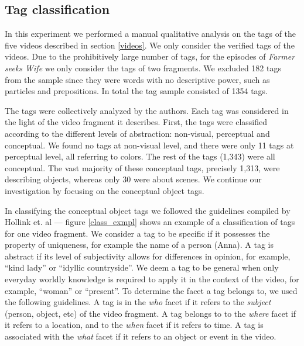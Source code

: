 \subsection{Tag classification}

In this experiment we performed a manual qualitative analysis on the tags of
the five videos described in section \ref{videos}. We only consider the
verified tags of the videos. Due to the prohibitively large number of tags,
for the episodes of \emph{Farmer seeks Wife} we only consider the tags of two
fragments. We excluded 182 tags from the sample since they were words with no
descriptive power, such as particles and prepositions. In total the tag sample
consisted of 1354 tags.

The tags were collectively analyzed by the authors. Each tag was considered in
the light of the video fragment it describes. First, the tags were classified
according to the different levels of abstraction: non-visual, perceptual and
conceptual. We found no tags at non-visual level, and there were only 11 tags
at perceptual level, all referring to colors. The rest of the tags (1,343)
were all conceptual. The vast majority of these conceptual tags, precisely
1,313, were describing objects, whereas only 30 were about scenes. We continue
our investigation by focusing on the conceptual object tags.

In classifying the conceptual object tags we followed the guidelines compiled
by Hollink et. al \cite{laurapaper} --- figure \ref{class_exmpl} shows an
example of a classification of tags for one video fragment. We consider a tag
to be specific if it possesses the property of uniqueness, for example the
name of a person (Anna). A tag is abstract if its level of subjectivity allows
for differences in opinion, for example, ``kind lady'' or ``idyllic
countryside''. We deem a tag to be general when only everyday worldly
knowledge is required to apply it in the context of the video, for example,
``woman'' or ``present''. To determine the facet a tag belongs to, we used the
following guidelines. A tag is in the \textit{who} facet if it refers to the
\textit{subject} (person, object, etc) of the video fragment. A tag belongs to
to the \textit{where} facet if it refers to a location, and to the
\textit{when} facet if it refers to time. A tag is associated with the
\textit{what} facet if it refers to an object or event in the video.

